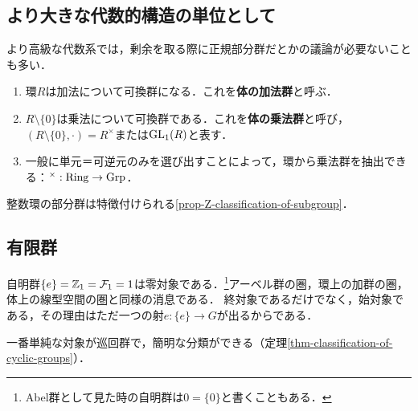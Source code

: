 \documentclass[uplatex,dvipdfmx]{jsreport}
\begin{document}
\subsection{より大きな代数的構造の単位として}

\begin{tcolorbox}[colframe=ForestGreen, colback=ForestGreen!10!white,breakable,colbacktitle=ForestGreen!40!white,coltitle=black,fonttitle=\bfseries\sffamily,
title=]
    より高級な代数系では，剰余を取る際に正規部分群だとかの議論が必要ないことも多い．
\end{tcolorbox}

\begin{example}\mbox{}
    \begin{enumerate}
        \item 環$R$は加法について可換群になる．これを\textbf{体の加法群}と呼ぶ．
        \item $R\setminus\{0\}$は乗法について可換群である．これを\textbf{体の乗法群}と呼び，$(R\setminus\{0\},\cdot)=R^\times$または$\mathrm{GL}_1(R)$と表す．
        \item 一般に単元＝可逆元のみを選び出すことによって，環から乗法群を抽出できる：${}^\times:\mathrm{Ring}\to\mathrm{Grp}$．
    \end{enumerate}
\end{example}

\begin{example}[整数環の部分群]
    整数環の部分群は特徴付けられる\ref{prop-Z-classification-of-subgroup}．
\end{example}

\subsection{有限群}

\begin{example}
    自明群$\{e\}=\mathbb{Z}_1=\mathcal{F}_1=1$は零対象である．\footnote{Abel群として見た時の自明群は$0=\{0\}$と書くこともある．}アーベル群の圏，環上の加群の圏，体上の線型空間の圏と同様の消息である．
    終対象であるだけでなく，始対象である，その理由はただ一つの射$e:\{e\}\to G$が出るからである．
\end{example}

\begin{example}
    一番単純な対象が巡回群で，簡明な分類ができる（定理\ref{thm-classification-of-cyclic-groups}）．
\end{example}
\end{document}
